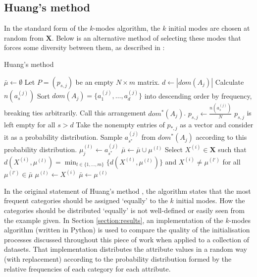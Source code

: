 \documentclass{article}
\theoremstyle{definition}
\begin{document}
\subsection{Huang's method}\label{subsection:huang}

In the standard form of the $k$-modes algorithm, the $k$ initial modes are chosen at random from $\textbf{X}$. Below is an alternative method of selecting these modes that forces some diversity between them, as described in \cite{Huang98}:

\begin{algorithm}[H]
\caption{Huang's method}\label{alg:huang}
	\begin{algorithmic}[0]
		\State $\bar{\mu} \gets \emptyset$
		\State Let $P = (p_{s,j})$ be an empty $N \times m$ matrix.
			\State $d \gets |dom(A_j)|$
				\State Calculate $n(a_s^{(j)})$
			\EndFor
			\State Sort $dom(A_j) = \{a_1^{(j)}, \ldots, a_d^{(j)}\}$ into descending order by frequency, breaking ties arbitrarily.
			\State Call this arrangement $dom^*(A_j)$.
				\State $p_{s,j} \gets \frac{n(a_s^{(j)})}{N}$
			\EndFor
			\State $p_{s,j}$ is left empty for all $s > d$
		\EndFor
				\State Take the nonempty entries of $p_{*,j}$ as a vector and consider it as a probability distribution.
				\State Sample $a_{s^*}^{(j)}$ from $dom^*(A_j)$ according to this probability distribution.
				\State $\mu_j^{(l)} \gets a_{s^*}^{(j)}$
			\EndFor
			\State $\bar{\mu} \gets \bar{\mu} \cup \mu^{(l)}$
		\EndFor
			\State Select $X^{(i)} \in \textbf{X}$ such that $d(X^{(i)}, \mu^{(l)}) = \min_{t \in \{1, \ldots, m\}} \{d(X^{(t)}, \mu^{(l)})\}$ and $X^{(i)} \ne \mu^{(l')}$ for all $\mu^{(l')} \in \bar{\mu}$
			\State $\mu^{(l)} \gets X^{(i)}$
			\State $\bar{\mu} \gets \mu^{(l)}$
		\EndFor
	\end{algorithmic}
\end{algorithm} 

In the original statement of Huang's method \cite{Huang98}, the algorithm states that the most frequent categories should be assigned `equally' to the $k$ initial modes. How the categories should be distributed `equally' is not well-defined or easily seen from the example given. In Section \ref{section:results}, an implementation of the $k$-modes algorithm (written in Python) is used to compare the quality of the initialisation processes discussed throughout this piece of work when applied to a collection of datasets. That implementation distributes the attribute values in a random way (with replacement) according to the probability distribution formed by the relative frequencies of each category for each attribute. \\
	
\end{document}
